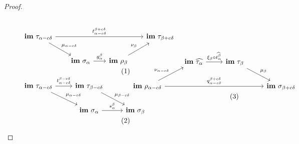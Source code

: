 \begin{proof}
  \vspace{3ex}
  \begin{scriptsize}
  \begin{subequations}
  \begin{minipage}{0.45\textwidth}
  \begin{equation}\label{dgm:intr_tight2a}\begin{tikzcd}[column sep=scriptsize]
    \im~\tau_{\alpha-c\of}  \arrow[to=Fb, "t_{\alpha-c\of}^{\beta+c\of}"]
                      \arrow[to=Ga, "\mu_{\alpha-c\of}"]
    & & & |[alias=Fb]|
      \im~\tau_{\beta+c\of} \\
    & |[alias=Ga]|
    \im~\sigma_\alpha \arrow[to=Gb, "g_\alpha^\beta"]
    & |[alias=Gb]|
      \im~\rho_\beta \arrow[to=Fb, "\nu_\beta"] &
  \end{tikzcd}\end{equation}
  \begin{equation}\label{dgm:intr_tight2b}\begin{tikzcd}
    \im~\tau_{\alpha-c\of}  \arrow[to=Fb, "t_{\alpha-c\of}^{\beta-c\of}"]
                      \arrow[to=Ga, "\mu_{\alpha-c\of}"]
    & |[alias=Fb]|
      \im~\tau_{\beta-c\of} \arrow[to=Gb, "\mu_{\beta -c\of}"] \\
    & |[alias=Ga]|
    \im~\sigma_\alpha \arrow[to=Gb, "s_\alpha^\beta"]
    & |[alias=Gb]|
      \im~\sigma_\beta
  \end{tikzcd}\end{equation}
  \end{minipage}
  \begin{minipage}{0.45\textwidth}
  \begin{equation}\label{dgm:intr_tight2c}\begin{tikzcd}
    & |[alias=Fa]|
    \im~\ext{\tau_\alpha}  \arrow[to=Fb, "\xi_\beta\circ\ext{t_\alpha^\beta}"]
    & |[alias=Fb]|
      \im~\tau_\beta  \arrow[to=Gb, "\mu_\beta"] & \\
    \im~\rho_{\alpha-c\of}  \arrow[to=Gb, "q_{\alpha-c\of}^{\beta+c\of}"]
                      \arrow[to=Fa, "\nu_{\alpha-c\of}"]
    & & & |[alias=Gb]|
      \im~\sigma_{\beta + c\of}
  \end{tikzcd}\end{equation}

\end{minipage}
\end{subequations}
\end{scriptsize}
\end{proof}
